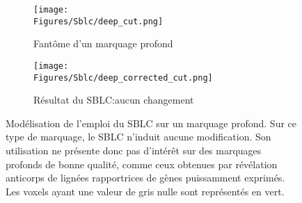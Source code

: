 \documentclass[\main/main.tex]{subfiles}
\begin{document}
\begin{figure}[h!]
    \centering
    \begin{subfigure}[b]{0.45\textwidth}
        
        \caption{Fantôme d'un marquage profond}
        \centering \texttt{[image: \\Figures/Sblc/deep\_cut.png]}
        \label{fig:sblc:defaut:deep:application}
    \end{subfigure}
    \begin{subfigure}[b]{0.45\textwidth} 
        \caption{Résultat du SBLC:\newline aucun changement}
        \centering \texttt{[image: \\Figures/Sblc/deep\_corrected\_cut.png]}
        \label{fig:sblc:defaut:deep:application}
    \end{subfigure}
    \caption{
        Modélisation de l'emploi du SBLC sur un marquage profond.
        \newline
        Sur ce type de marquage, le SBLC n'induit aucune modification. Son utilisation ne présente donc pas d'intérêt sur des marquages profonds de bonne qualité, comme ceux  obtenues par révélation anticorps de lignées rapportrices de gènes puissamment exprimés.
        \newline
        Les voxels ayant une valeur de gris nulle sont représentés en vert.
        }
    \label{fig:sblc:defaut:deep}
\end{figure}
\end{document}
